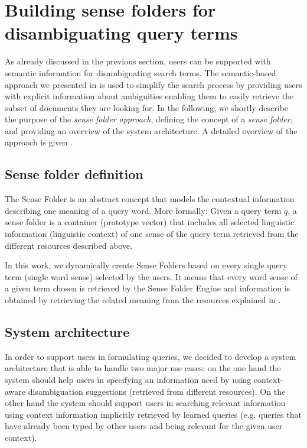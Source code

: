 \documentclass[output=paper]{LSP/langsci}
\begin{document}
\section{Building sense folders for disambiguating query terms} \label{SFOverw}
As already discussed in the previous section, users can be supported with semantic information for disambiguating search terms. The semantic-based approach we presented in \citet{delNue06c} is used to simplify the search process by providing users with explicit information about ambiguities enabling them to easily retrieve the subset of documents they are looking for. In the following, we shortly describe the purpose of the \textit{sense folder approach}, defining the concept of a \textit{sense folder}, and providing an overview of the system architecture. A detailed overview of the approach is given \citet{del08book}.

\subsection{Sense folder definition} \label{SFdef}
The Sense Folder is an abstract concept that models the contextual information describing one meaning of a query word. More formally: Given a query term $q$, a sense folder is a container (prototype vector) that includes all selected linguistic information (linguistic context) of one sense of the query term retrieved from the different resources described above.\par 

In this work, we dynamically create Sense Folders based on every single query term (single word sense) selected by the users. It means that every word sense of a given term chosen is retrieved by the Sense Folder Engine and information is obtained by retrieving the related meaning from the resources explained in . 


\subsection{System architecture} \label{SysArchit}
In order to support users in formulating queries, we decided to develop a system architecture that is able to handle two major use cases: on the one hand the system should help users in specifying an information need by using context-aware disambiguation suggestions (retrieved from different resources). On the other hand the system should support users in searching relevant information using context information implicitly retrieved by learned queries (e.g. queries that have already been typed by other users and being relevant for the given user context).
\end{document}
